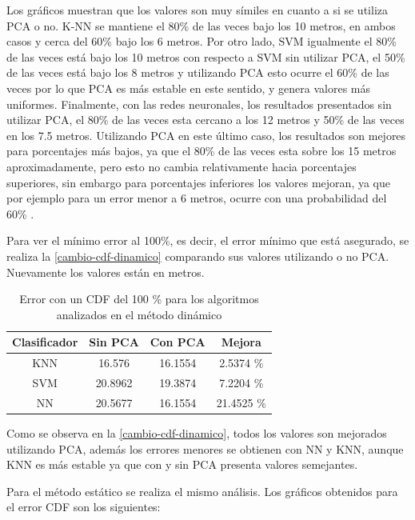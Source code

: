 Los gráficos muestran que los valores son muy símiles en cuanto a si se utiliza PCA o no. K-NN se mantiene el 80\% de las veces bajo los 10 metros, en ambos casos y cerca del 60\% bajo los 6 metros. Por otro lado, SVM igualmente el 80\% de las veces está bajo los 10 metros con respecto a SVM sin utilizar PCA, el 50\% de las veces está bajo los 8 metros y utilizando PCA esto ocurre el 60\% de las veces por lo que PCA es más estable en este sentido, y genera valores más uniformes. Finalmente, con las redes neuronales, los resultados presentados sin utilizar PCA, el 80\% de las veces esta cercano a los 12 metros y 50\% de las veces en los 7.5 metros. Utilizando PCA en este último caso, los resultados son mejores para porcentajes más bajos, ya que el 80\% de las veces esta sobre los 15 metros aproximadamente,  pero esto no cambia relativamente hacia porcentajes superiores, sin embargo para porcentajes inferiores los valores mejoran, ya que por ejemplo para un error menor a 6 metros, ocurre con una probabilidad del 60\% .

Para ver el mínimo error al 100\%, es decir, el error mínimo que está asegurado, se realiza la \autoref{cambio-cdf-dinamico} comparando sus valores utilizando o no PCA. Nuevamente los valores están en metros.

\newpage

\begin{table}[!h]
\centering
\caption[Error con un CDF del 100 \% para los algoritmos analizados  en el método dinámico]{Error con un CDF del 100 \% para los algoritmos analizados  en el método dinámico}
\label{cambio-cdf-dinamico}
\begin{tabular}{|c|c|c|c|}
\hline
Clasificador & Sin PCA & Con PCA & Mejora     \\ \hline
KNN          & 16.576  & 16.1554 & 2.5374 \%  \\ \hline
SVM          & 20.8962 & 19.3874 & 7.2204 \%  \\ \hline
NN           & 20.5677 & 16.1554 & 21.4525 \% \\ \hline
\end{tabular}
\end{table}


Como se observa en la \autoref{cambio-cdf-dinamico}, todos los valores son mejorados utilizando PCA, además los errores menores se obtienen con NN y KNN, aunque KNN es más estable ya que con y sin PCA presenta valores semejantes.

Para el método estático se realiza el mismo análisis. Los gráficos obtenidos para el error CDF son los siguientes:

